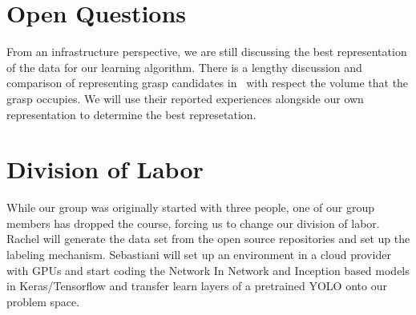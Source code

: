 \documentclass[letterpaper, 10 pt]{article}
\begin{document}
\section{Open Questions}

From an infrastructure perspective, we are still discussing the best representation of the data for our learning algorithm.
There is a lengthy discussion and comparison of representing grasp candidates in~\cite{pas2017grasp} with respect the volume that the grasp occupies.
We will use their reported experiences alongside our own representation to determine the best represetation. 


\section{Division of Labor}

While our group was originally started with three people, one of our group members has dropped the course, forcing us to change our division of labor. 
Rachel will generate the data set from the open source repositories and set up the labeling mechanism. 
Sebastiani will set up an environment in a cloud provider with GPUs and start coding the Network In Network and Inception based models in Keras/Tensorflow and transfer learn layers of a pretrained YOLO onto our problem space.  

{\footnotesize
    
}
\end{document}
